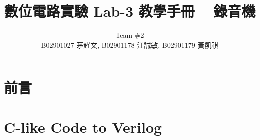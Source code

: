 \documentclass[12pt, a4paper]{article}
\title{數位電路實驗 Lab-3 教學手冊 -- 錄音機 \vspace{-0.2cm}}
\author{Team \#2 \\ B02901027 茅耀文, B02901178 江誠敏, B02901179 黃凱祺}
\begin{document}
\maketitle

\setcounter{section}{-1}
\section{前言}

\section{C-like Code to Verilog}
\end{document}
